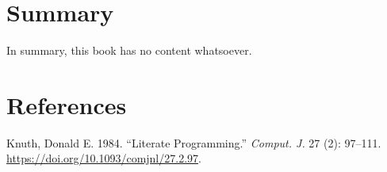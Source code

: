 \documentclass[
  letterpaper,
  DIV=11,
  numbers=noendperiod]{scrreprt}
\newlength{\cslhangindent}
\newenvironment{CSLReferences}[2] %
 {\begin{list}{}{%
  \setlength{\itemindent}{0pt}
  \setlength{\leftmargin}{0pt}
  \setlength{\parsep}{0pt}
  \ifodd #1
   \setlength{\leftmargin}{\cslhangindent}
   \setlength{\itemindent}{-1\cslhangindent}
  \fi
  \setlength{\itemsep}{#2\baselineskip}}}
 {\end{list}}
\begin{document}
\chapter{Summary}\label{summary}

In summary, this book has no content whatsoever.


\chapter*{References}\label{references}


\label{refs}
\begin{CSLReferences}{1}{0}
Knuth, Donald E. 1984. {``Literate Programming.''} \emph{Comput. J.} 27
(2): 97--111. \url{https://doi.org/10.1093/comjnl/27.2.97}.

\end{CSLReferences}
\end{document}
